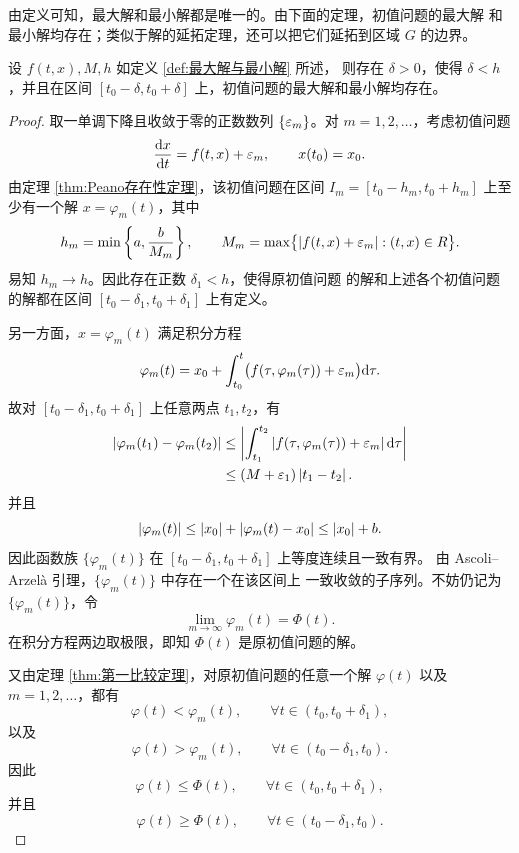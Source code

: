 由定义可知，最大解和最小解都是唯一的。由下面的定理，初值问题的最大解
和最小解均存在；类似于解的延拓定理，还可以把它们延拓到区域 $G$ 的边界。

\begin{proposition}\label{thm:最大解与最小解的局部存在性}
	设 $f(t,x),M,h$ 如定义 \ref{def:最大解与最小解} 所述，
	则存在 $\delta>0$，使得 $\delta<h$，并且在区间
	$[t_0-\delta,t_0+\delta]$ 上，初值问题的最大解和最小解均存在。
\end{proposition}

\begin{proof}
	取一单调下降且收敛于零的正数数列 $\{\varepsilon_m\}$。对
	$m=1,2,\ldots$，考虑初值问题
	\[
		\dfrac{\mathrm{d} x}{\mathrm{d} t}=f(t,x)+\varepsilon_m,
		\qquad x(t_0)=x_0.
	\]
	由定理 \ref{thm:Peano存在性定理}，该初值问题在区间
	$I_m=[t_0-h_m,t_0+h_m]$ 上至少有一个解 $x=\varphi_m(t)$，其中
	\[
		h_m=\min\left\{a,\dfrac{b}{M_m}\right\},
		\qquad
		M_m=\max\bigl\{\left| f(t,x)+\varepsilon_m \right|:(t,x)\in R\bigr\}.
	\]
	易知 $h_m\to h$。因此存在正数 $\delta_1<h$，使得原初值问题
	的解和上述各个初值问题的解都在区间
	$[t_0-\delta_1,t_0+\delta_1]$ 上有定义。

	另一方面，$x=\varphi_m(t)$ 满足积分方程
	\[
		\varphi_m(t)=x_0+\int_{t_0}^{t}
		\bigl(f(\tau,\varphi_m(\tau))+\varepsilon_m\bigr)\mathrm{d}\tau.
	\]
	故对 $[t_0-\delta_1,t_0+\delta_1]$ 上任意两点 $t_1,t_2$，有
	\[
	\begin{aligned}
		\left| \varphi_m(t_1)-\varphi_m(t_2) \right|
		&\leq
		\left| \int_{t_1}^{t_2}
		\left| f(\tau,\varphi_m(\tau))+\varepsilon_m \right|\mathrm{d}\tau \right|\\
		&\leq(M+\varepsilon_1)\left| t_1-t_2 \right|.
	\end{aligned}
	\]
	并且
	\[
		\left| \varphi_m(t) \right|
		\leq\left| x_0 \right|+\left| \varphi_m(t)-x_0 \right|
		\leq\left| x_0 \right|+b.
	\]
	因此函数族 $\{\varphi_m(t)\}$ 在
	$[t_0-\delta_1,t_0+\delta_1]$ 上等度连续且一致有界。
	由 Ascoli--Arzelà 引理，$\{\varphi_m(t)\}$ 中存在一个在该区间上
	一致收敛的子序列。不妨仍记为 $\{\varphi_m(t)\}$，令
	\[
		\lim_{m\to\infty}\varphi_m(t)=\Phi(t).
	\]
	在积分方程两边取极限，即知 $\Phi(t)$ 是原初值问题的解。

	又由定理 \ref{thm:第一比较定理}，对原初值问题的任意一个解
	$\varphi(t)$ 以及 $m=1,2,\ldots$，都有
	\[
		\varphi(t)<\varphi_m(t),
		\qquad \forall t\in(t_0,t_0+\delta_1),
	\]
	以及
	\[
		\varphi(t)>\varphi_m(t),
		\qquad \forall t\in(t_0-\delta_1,t_0).
	\]
	因此
	\[
		\varphi(t)\leq\Phi(t),
		\qquad \forall t\in(t_0,t_0+\delta_1),
	\]
	并且
	\[
		\varphi(t)\geq\Phi(t),
		\qquad \forall t\in(t_0-\delta_1,t_0).
	\]


\end{proof}
